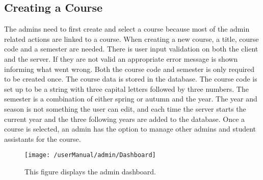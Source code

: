 \subsection{Creating a Course}
The admins need to first create and select a course because most of the admin related actions are linked to a course. When creating a new course, a title, course code and a semester are needed. There is user input validation on both the client and the server. If they are not valid an appropriate error message is shown informing what went wrong. Both the course code and semester is only required to be created once. The course data is stored in the database. The course code is set up to be a string with three capital letters followed by three numbers.  The semester is a combination of either spring or autumn and the year. The year and season is not something the user can edit, and each time the server starts the current year and the three following years are added to the database. Once a course is selected, an admin has the option to manage other admins and student assistants for the course.

\begin{figure}[H]
	\centering
	\texttt{[image: /userManual/admin/Dashboard]}
	\label{fig:adminDashboard}
	\caption{This figure displays the admin dashboard.}
\end{figure}